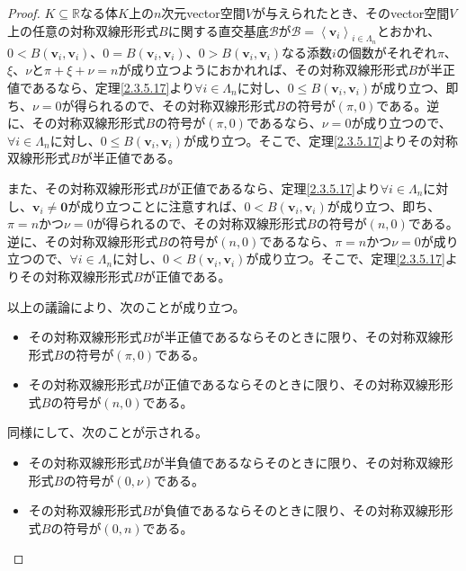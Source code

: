 \documentclass[dvipdfmx]{jsarticle}
\begin{document}
\begin{proof}
$K \subseteq \mathbb{R}$なる体$K$上の$n$次元vector空間$V$が与えられたとき、そのvector空間$V$上の任意の対称双線形形式$B$に関する直交基底$\mathcal{B}$が$\mathcal{B} =\left\langle \mathbf{v}_{i} \right\rangle_{i \in \varLambda_{n}}$とおかれ、$0 < B\left( \mathbf{v}_{i},\mathbf{v}_{i} \right)$、$0 = B\left( \mathbf{v}_{i},\mathbf{v}_{i} \right)$、$0 > B\left( \mathbf{v}_{i},\mathbf{v}_{i} \right)$なる添数$i$の個数がそれぞれ$\pi$、$\xi$、$\nu$と$\pi + \xi + \nu = n$が成り立つようにおかれれば、その対称双線形形式$B$が半正値であるなら、定理\ref{2.3.5.17}より$\forall i \in \varLambda_{n}$に対し、$0 \leq B\left( \mathbf{v}_{i},\mathbf{v}_{i} \right)$が成り立つ、即ち、$\nu = 0$が得られるので、その対称双線形形式$B$の符号が$(\pi,0)$である。逆に、その対称双線形形式$B$の符号が$(\pi,0)$であるなら、$\nu = 0$が成り立つので、$\forall i \in \varLambda_{n}$に対し、$0 \leq B\left( \mathbf{v}_{i},\mathbf{v}_{i} \right)$が成り立つ。そこで、定理\ref{2.3.5.17}よりその対称双線形形式$B$が半正値である。\par
また、その対称双線形形式$B$が正値であるなら、定理\ref{2.3.5.17}より$\forall i \in \varLambda_{n}$に対し、$\mathbf{v}_{i} \neq \mathbf{0}$が成り立つことに注意すれば、$0 < B\left( \mathbf{v}_{i},\mathbf{v}_{i} \right)$が成り立つ、即ち、$\pi = n$かつ$\nu = 0$が得られるので、その対称双線形形式$B$の符号が$(n,0)$である。逆に、その対称双線形形式$B$の符号が$(n,0)$であるなら、$\pi = n$かつ$\nu = 0$が成り立つので、$\forall i \in \varLambda_{n}$に対し、$0 < B\left( \mathbf{v}_{i},\mathbf{v}_{i} \right)$が成り立つ。そこで、定理\ref{2.3.5.17}よりその対称双線形形式$B$が正値である。\par
以上の議論により、次のことが成り立つ。
\begin{itemize}
\item
  その対称双線形形式$B$が半正値であるならそのときに限り、その対称双線形形式$B$の符号が$(\pi,0)$である。
\item
  その対称双線形形式$B$が正値であるならそのときに限り、その対称双線形形式$B$の符号が$(n,0)$である。
\end{itemize}
同様にして、次のことが示される。
\begin{itemize}
\item
  その対称双線形形式$B$が半負値であるならそのときに限り、その対称双線形形式$B$の符号が$(0,\nu)$である。
\item
  その対称双線形形式$B$が負値であるならそのときに限り、その対称双線形形式$B$の符号が$(0,n)$である。
\end{itemize}
\end{proof}
\end{document}
